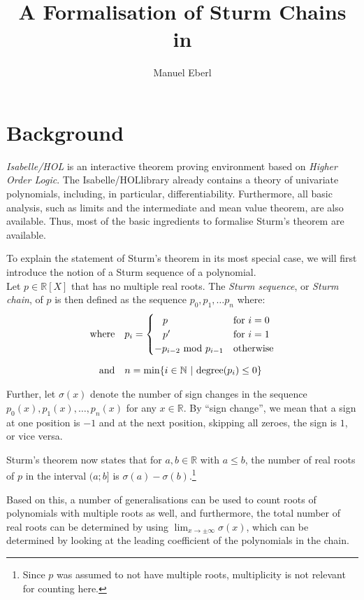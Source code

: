 \documentclass[11pt,a4paper,oneside]{article}
\title{A Formalisation of Sturm Chains in \isabellehol}
\author{Manuel Eberl}
\newcommand{\RR}{\mathbb{R}}
\newcommand{\NN}{\mathbb{N}}
\newcommand{\isabellehol}{\mbox{Isabelle}\slash HOL}
\begin{document}
\maketitle
\vskip-3mm

\section{Background}

\emph{\isabellehol} is an interactive theorem proving environment based on 
\emph{Higher Order Logic}. The \isabellehol library already contains a 
theory of univariate polynomials, including, in particular, differentiability. 
Furthermore, all basic analysis, such as limits and the intermediate and mean value 
theorem, are also available. Thus, most of the basic ingredients to 
formalise Sturm's theorem are available.

To explain the statement of Sturm's theorem in its most special case, 
we will first introduce the notion of a Sturm sequence of a polynomial.\\
Let $p\in\RR[X]$ that has no multiple real roots. The \emph{Sturm sequence}, 
or \emph{Sturm chain}, of $p$ is then defined as the sequence 
$p_0,p_1,\ldots p_n$ where:
\begin{align*}
&&\mathrm{where}\quad &p_i = \begin{cases}
\hskip3mm p & \mathrm{for}\ i = 0\\
\hskip3mm p' & \mathrm{for}\ i = 1\\
-p_{i-2}\ \mathrm{mod}\ p_{i-1} &\mathrm{otherwise}
\end{cases}&\\[2mm]
&&\mathrm{and}\quad &n=\mathrm{min} \{i\in\NN\ |\ \mathrm{degree}(p_i) \leq 0\}&
\end{align*}

Further, let $\sigma(x)$ denote the number of sign changes in the sequence 
$p_0(x), p_1(x), \ldots, p_n(x)$ for any $x \in \RR$. 
By \enquote{sign change}, we mean that a sign at one position is $-1$ and at the 
next position, skipping all zeroes, the sign is $1$, or vice versa.

Sturm's theorem now states that for $a,b\in\RR$ with $a\leq b$, the number of 
real roots of $p$ in the interval $(a;b]$ is $\sigma(a)-\sigma(b)$.\footnote{
Since $p$ was assumed to not have multiple roots, multiplicity is not relevant 
for counting here.}

Based on this, a number of generalisations can be used to count roots of 
polynomials with multiple roots as well, and furthermore, the total number of 
real roots can be determined by using $\lim_{x\to\pm\infty} \sigma(x)$, which 
can be determined by looking at the leading coefficient of the polynomials in 
the chain.
\end{document}
